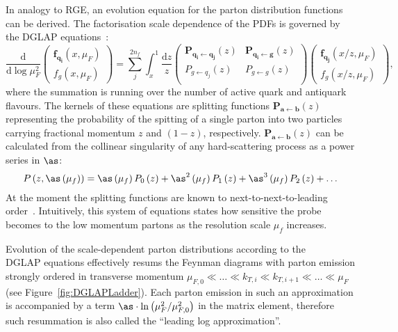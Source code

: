 In analogy to RGE, an evolution equation for the parton distribution functions can be derived. The factorisation scale dependence of the PDFs is governed by the DGLAP equations~\cite{Altarelli:1977zs,Gribov:1972,Dokshitzer:1977,Balitsky:1978}:
\begin{equation}
\frac{\mathrm{d}}{\mathrm{d}\log{\mu_F^2}}
 \begin{pmatrix}
	\mathbf{f_{q_i}}\left(x,\mu_F\right) \\
	f_g\left(x,\mu_F\right)
 \end{pmatrix} = 
\sum_j^{2n_f}{\int_x^1{\frac{\mathrm{d}z}{z}
 \begin{pmatrix}
  \mathbf{P_{q_i \leftarrow q_j}}\left(z\right) & \mathbf{P_{q_i \leftarrow  g}}\left(z\right) \\
  P_{g \leftarrow q_j}\left(z\right) & P_{g \leftarrow g}\left(z\right) \\
 \end{pmatrix}
 \begin{pmatrix}
	\mathbf{f_{q_j}}\left(x/z,\mu_F\right) \\
	f_g\left(x/z,\mu_F\right)
 \end{pmatrix}
}},
\label{eq:dglap}
\end{equation}
where the summation is running over the number of active quark and antiquark flavours. The kernels of these equations are splitting functions $\mathbf{P_{a \leftarrow  b}}\left(z\right)$ representing the probability of the spitting of a single parton into two particles carrying fractional momentum $z$ and $\left(1-z\right)$, respectively. $\mathbf{P_{a \leftarrow  b}}\left(z\right)$ can be calculated from the collinear singularity of any hard-scattering process as a power series in $\as$:
\begin{equation}
P\left(z,\as\left(\mu_f\right)\right) = \as\left(\mu_f\right) P_0\left(z\right) + \as^2\left(\mu_f\right)P_1\left(z\right) + \as^3\left(\mu_f\right)P_2\left(z\right) + \dots
\label{eq:splittingfunc}
\end{equation}
At the moment the splitting functions are known to next-to-next-to-leading order~\cite{Vogt:2004mw,Moch:2004pa}. Intuitively, this system of equations states how sensitive the probe becomes to the low momentum partons as the resolution scale $\mu_f$ increases. %

Evolution of the scale-dependent parton distributions according to the \\DGLAP equations effectively resums the Feynman diagrams with parton emission strongly ordered in transverse momentum $ \mu_{F,0} \ll \ldots \ll k_{T,i} \ll k_{T,i+1} \ll \ldots \ll \mu_F$ (see Figure~\ref{fig:DGLAPLadder}). Each parton emission in such an approximation is accompanied by a term $\as\cdot\ln{\left(\mu^2_F/\mu^2_{F,0}\right)}$ in the matrix element, therefore such resummation is also called the ``leading log approximation''.

